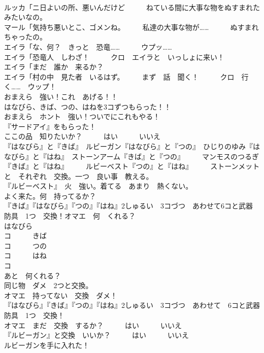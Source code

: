 \documentclass[8pt]{extreport}
\begin{document}
\begin{CJK}{UTF8}{min}
\\	ルッカ「ニ日よいの所、悪いんだけど　　　ねている間に大事な物をぬすまれた　　　みたいなの。	
\\	マール「気持ち悪いとこ、ゴメンね。　　　私達の大事な物が……　　　ぬすまれちゃったの。	
\\	エイラ「な、何？　きっと　恐竜……　　　ウプッ……	
\\	エイラ「恐竜人　しわざ！　　　クロ　エイラと　いっしょに来い！	
\\	エイラ「まだ　誰か　来るか？	
\\	エイラ「村の中　見た者　いるはず。　　　まず　話　聞く！　　　クロ　行く……　ウップ！	
\\	おまえら　強い！これ　あげる！！	
\\	はなびら、きば、つの、はねを3コずつもらった！！	
\\	おまえら　ホント　強い！ついでにこれもやる！	
\\	『サードアイ』をもらった！	
\\	ここの品　知りたいか？　　　はい　　　いいえ	
\\	『はなびら』と『きば』　ルビーガン『はなびら』と『つの』　ひじりのゆみ『はなびら』と『はね』　ストーンアーム『きば』と『つの』　　　マンモスのつるぎ	
\\	『きば』と『はね』　　　ルビーベスト『つの』と『はね』　　　ストーンメットと　それぞれ　交換。一つ　良い事　教える。	
\\	『ルビーベスト』　火　強い。着てる　あまり　熱くない。	
\\	よく来た。何　持ってるか？	
\\	『きば』『はなびら』『つの』『はね』2しゅるい　3コづつ　あわせて6コと武器　防具　1つ　交換！オマエ　何　くれる？	
\\	はなびら　　
\\	コ　　　きば　　　　
\\	コ　　　つの　　　　
\\	コ　　　はね　　　　
\\	コ	
\\	あと　何くれる？	
\\	同じ物　ダメ　2つと交換。	
\\	オマエ　持ってない　交換　ダメ！	
\\	『はなびら』『きば』『つの』『はね』2しゅるい　3コづつ　あわせて　6コと武器　防具　1つ　交換！	
\\	オマエ　まだ　交換　するか？　　　はい　　　いいえ	
\\	『ルビーガン』と交換　いいか？　　　はい　　　いいえ	
\\	ルビーガンを手に入れた！	

\end{CJK}
\end{document}
